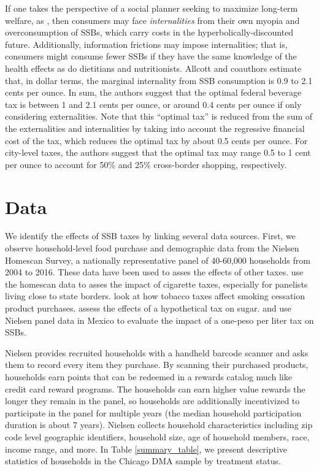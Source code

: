 \documentclass[12pt]{article}
\begin{document}
If one takes the perspective of a social planner seeking to maximize long-term welfare, as \textcite{allcott2019regressive}, then consumers may face \textit{internalities} from their own myopia and overconsumption of SSBs, which carry costs in the hyperbolically-discounted future. Additionally, information frictions may impose internalities; that is, consumers might consume fewer SSBs if they have the same knowledge of the health effects as do dietitians and nutritionists. Allcott and coauthors estimate that, in dollar terms, the marginal internality from SSB consumption is 0.9 to 2.1 cents per ounce. In sum, the authors suggest that the optimal federal beverage tax is between 1 and 2.1 cents per ounce, or around 0.4 cents per ounce if only considering externalities. Note that this ``optimal tax'' is reduced from the sum of the externalities and internalities by taking into account the regressive financial cost of the tax, which reduces the optimal tax by about 0.5 cents per ounce. For city-level taxes, the authors suggest that the optimal tax may range 0.5 to 1 cent per ounce to account for 50\% and 25\% cross-border shopping, respectively.

\section{Data} \label{data}

We identify the effects of SSB taxes by linking several data sources. First, we observe household-level food purchase and demographic data from the Nielsen Homescan Survey, a nationally representative panel of 40-60,000 households from 2004 to 2016. These data have been used to asses the effects of other taxes. \textcite{harding2012heterogeneous} use the homescan data to asses the impact of cigarette taxes, especially for panelists living close to state borders. \textcite{cotti2016effects} look at how tobacco taxes affect smoking cessation product purchases. \textcite{dharmasena2012intended} assess the effects of a hypothetical tax on sugar. \textcite{colchero2016beverage} and \textcite{colchero2017mexico} use Nielsen panel data in Mexico to evaluate the impact of a one-peso per liter tax on SSBs.

Nielsen provides recruited households with a handheld barcode scanner and asks them to record every item they purchase. By scanning their purchased products, households earn points that can be redeemed in a rewards catalog much like credit card reward programs. The households can earn higher value rewards the longer they remain in the panel, so households are additionally incentivized to participate in the panel for multiple years (the median household participation duration is about 7 years). Nielsen collects household characteristics including zip code level geographic identifiers, household size, age of household members, race, income range, and more. In Table \ref{summary_table}, we present descriptive statistics of households in the Chicago DMA sample by treatment status.
\end{document}
